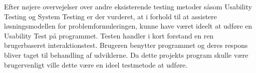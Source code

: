 \vspace{5mm}

Efter nøjere overvejelser over andre eksisterende testing metoder såsom Usability Testing og System Testing er der vurderet, at i forhold til at assistere løsningsmodellen for problemformuleringen, kunne have været ideelt at udføre en Usability Test på programmet. Testen handler i kort forstand en ren brugerbaseret interaktionstest. Brugeren benytter programmet og deres respons bliver taget til behandling af udviklerne.\cite{usability} Da dette projekts program skulle være brugervenligt ville dette være en ideel testmetode at udføre.